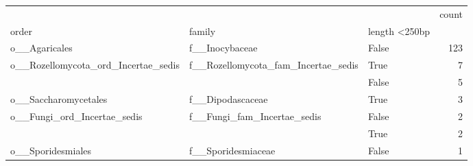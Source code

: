 \begin{tabular}{lllr}
\toprule
 &  &  & count \\
order & family & length <250bp &  \\
\midrule
o\_\_Agaricales & f\_\_Inocybaceae & False & 123 \\
\cline{1-4} \cline{2-4}
\multirow[t]{2}{*}{o\_\_Rozellomycota\_ord\_Incertae\_sedis} & \multirow[t]{2}{*}{f\_\_Rozellomycota\_fam\_Incertae\_sedis} & True & 7 \\
 &  & False & 5 \\
\cline{1-4} \cline{2-4}
o\_\_Saccharomycetales & f\_\_Dipodascaceae & True & 3 \\
\cline{1-4} \cline{2-4}
\multirow[t]{2}{*}{o\_\_Fungi\_ord\_Incertae\_sedis} & \multirow[t]{2}{*}{f\_\_Fungi\_fam\_Incertae\_sedis} & False & 2 \\
 &  & True & 2 \\
\cline{1-4} \cline{2-4}
o\_\_Sporidesmiales & f\_\_Sporidesmiaceae & False & 1 \\
\cline{1-4} \cline{2-4}
\bottomrule
\end{tabular}
